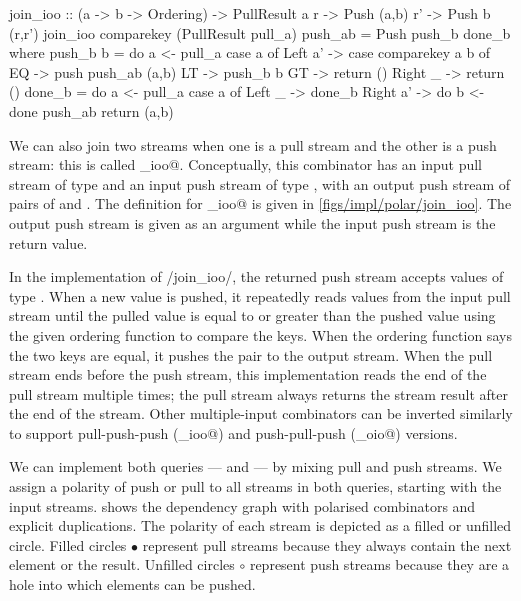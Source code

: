 \begin{haskell}[float,caption=Polarised implementation of \Hs/join_ioo/,label=figs/impl/polar/join_ioo]
join_ioo :: (a -> b -> Ordering) -> PullResult a r
         -> Push (a,b) r'        -> Push b (r,r')
join_ioo comparekey (PullResult pull_a) push_ab = Push push_b done_b
 where
  push_b b = do
    a <- pull_a
    case a of
     Left a' -> case comparekey a b of
                 EQ -> push push_ab (a,b)
                 LT -> push_b b
                 GT -> return ()
     Right _ -> return () 
  done_b = do
    a <- pull_a
    case a of
     Left _   -> done_b
     Right a' -> do
      b <- done push_ab
      return (a,b)
\end{haskell}


We can also join two streams when one is a pull stream and the other is a push stream: this is called \Hs@join_ioo@.
Conceptually, this combinator has an input pull stream of type \Hs@a@ and an input push stream of type \Hs@b@, with an output push stream of pairs of \Hs@a@ and \Hs@b@.
The definition for \Hs@join_ioo@ is given in \cref{figs/impl/polar/join_ioo}.
The output push stream is given as an argument while the input push stream is the return value.

In the implementation of \Hs/join_ioo/, the returned push stream accepts values of type \Hs@b@.
When a new value is pushed, it repeatedly reads values from the input pull stream until the pulled value is equal to or greater than the pushed value using the given ordering function to compare the keys.
When the ordering function says the two keys are equal, it pushes the pair to the output stream.
When the pull stream ends before the push stream, this implementation reads the end of the pull stream multiple times; the pull stream always returns the stream result after the end of the stream.
Other multiple-input combinators can be inverted similarly to support pull-push-push (\Hs@_ioo@) and push-pull-push (\Hs@_oio@) versions.

We can implement both \Hs@priceAnalyses@ queries --- \Hs@priceOverTime@ and \Hs@priceOverMarket@ --- by mixing pull and push streams.
We assign a polarity of push or pull to all streams in both queries, starting with the input streams.
 shows the dependency graph with polarised combinators and explicit duplications.
The polarity of each stream is depicted as a filled or unfilled circle.
Filled circles $\bullet$ represent pull streams because they always contain the next element or the result.
Unfilled circles $\circ$ represent push streams because they are a hole into which elements can be pushed.

